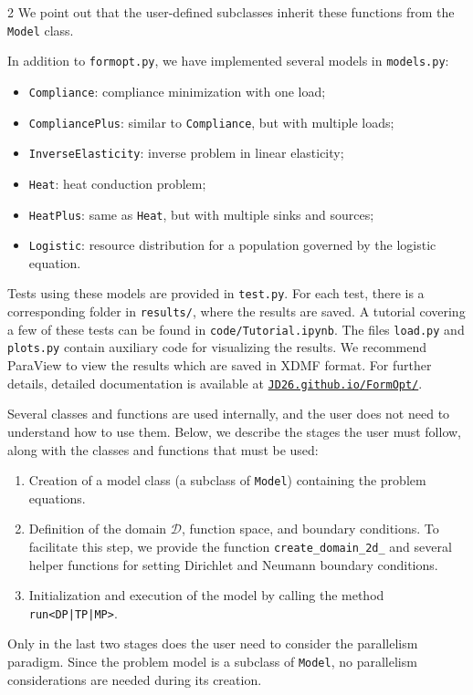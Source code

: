 \documentclass[a4paper, oneside]{article}
\newcommand{\code}[1]{\texttt{#1}}
\begin{document}
\begin{multicols}{2}
We point out that the user-defined subclasses inherit these functions from the \code{Model} class.

In addition to \code{formopt.py}, we have implemented several models in \code{models.py}:
\begin{itemize}[left=0.0em]
\item \code{Compliance}: compliance minimization with one load;
\item \code{CompliancePlus}: similar to \code{Compliance}, but with multiple loads;
\item \code{InverseElasticity}: inverse problem in linear elasticity;
\item \code{Heat}: heat conduction problem;
\item \code{HeatPlus}: same as \code{Heat}, but with multiple sinks and sources;
\item \code{Logistic}: resource distribution for a population governed by the logistic equation.
\end{itemize}

Tests using these models are provided in \code{test.py}.
For each test, there is a corresponding folder in \code{results/},
where the results are saved. 
A tutorial covering a few of these tests can be found in \code{code/Tutorial.ipynb}.
The files \code{load.py} and \code{plots.py} contain auxiliary code
for visualizing the results. 
We recommend ParaView \cite{10.5555/2789330}
to view the results which are saved in XDMF format. 
For further details,
detailed documentation is available at
\href{https://JD26.github.io/FormOpt/}{\texttt{JD26.github.io/FormOpt/}}.

Several classes and functions are used internally, and the user does not need
to understand how to use them. Below, we describe the stages the user must follow,
along with the classes and functions that must be used:
\begin{enumerate}[left=0.0em]
\item
Creation of a model class (a subclass of \code{Model})
containing the problem equations. 
\item
Definition of the domain $\mathcal{D}$, function space, and boundary conditions.
To facilitate this step, we provide the function
\code{create\_domain\_2d\_<DP|TP|MP>} and several helper functions
for setting Dirichlet and Neumann boundary conditions. 
\item
Initialization and execution of the model
by calling the method \code{run<DP|TP|MP>}.
\end{enumerate}
Only in the last two stages does the user need to consider the parallelism paradigm.
Since the problem model is a subclass of \code{Model},
no parallelism considerations are needed during its creation.



\end{multicols}
\end{document}
